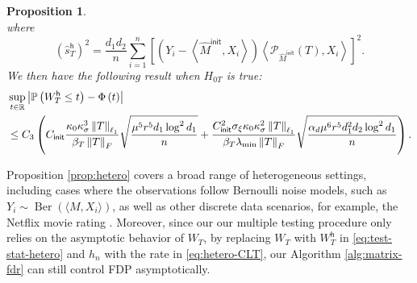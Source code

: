 \documentclass[12pt]{article}
\newcommand{\tF}{{\rm F}}
\newcommand{\norm}[1]{\left\lVert#1\right\rVert}
\newcommand{\cP}{\mathcal{P}}
\newcommand{\init}{{\mathsf{init}}}
\newcommand{\sfh}{{\mathsf{h}}}
\theoremstyle{plain}
\newtheorem{Proposition}{Proposition}
\begin{document}
\begin{sloppypar}
\begin{Proposition}
\begin{equation}
\end{equation} 
where
\begin{equation}
    \left(\widehat{s}_{T}^{\mathsf{h}}\right)^2 = \frac{d_1 d_2}{n}\sum_{i=1}^n\left[\left(Y_i-\left\langle \widehat M^{\init},X_i \right\rangle\right)\left\langle\cP_{\widehat M^{\init}}(T), X_i\right\rangle \right]^2.
\end{equation}
We then have the following result when $H_{0T}$ is true:
\begin{equation}\label{eq:hetero-CLT}
\begin{aligned}
    &\sup _{t\in \mathbb{R}}\left|\mathbb{P}\left(W_{T}^{\sfh} \leq t\right)-\Phi\left(t\right)\right|
    \\
    &
\le C_3\left(  C_{\init}   \frac{\kappa_0 \kappa_{\sigma}^3\norm{T}_{\ell_1}}{\beta_T \norm{T}_{\tF}} \sqrt{\frac{ \mu^{5} r^5 d_1 \log^2 d_1  }{ n}} +  \frac{ C_{\init}^2\sigma_{\xi}  \kappa_0 \kappa_{\sigma}^2 \norm{T}_{\ell_1} }{\beta_T \lambda_{\min}  \norm{T}_\tF }\sqrt{\frac{\alpha_d \mu^{6} r^{5 } d_1^2 d_2  \log^2 d_1 }{ n } } \right).
\end{aligned} %
\end{equation}

\end{Proposition}
Proposition \ref{prop:hetero} covers a broad range of heterogeneous settings, including cases where the observations follow Bernoulli noise models, such as $Y_i \sim \operatorname{Ber}(\langle M, X_i \rangle)$, as well as other discrete data scenarios, for example, the Netflix movie rating \citep{bennett2007netflix}. Moreover, since our our multiple testing procedure only relies on the asymptotic behavior of $W_T$, by replacing $W_T$ with $W_T^{\sfh}$ in \eqref{eq:test-stat-hetero} and $h_n$ with the rate in \eqref{eq:hetero-CLT}, our Algorithm \ref{alg:matrix-fdr} can still control FDP asymptotically.


\end{sloppypar}
\end{document}
